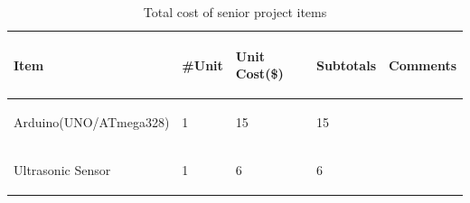 \documentclass[12pt,a4paper]{report}
\begin{document}
\section{\fontsize{12}{12}\selectfont{Resources and Cost Management}}

\begin{table}[H]
\begin{center}
\caption{Total cost of senior project items}
\label{tab:Table1}  
\begin{tabular}{|p{6cm}  |p{1cm}  |p{2cm}  |p{1.7cm} |p{3.5cm}|}

\hline
\begin{center}
\textbf{Item} 
\end{center}

& \begin{center}
\textbf{\#Unit }
\end{center}

& \begin{center}
\textbf{Unit Cost(\$)}
\end{center}

&\begin{center}
 \textbf{Subtotals}
\end{center}

& \begin{center}
\textbf{Comments}
\end{center}

 \\ 



\hline
\begin{center} Arduino(UNO/ATmega328)    \end{center}  &\begin{center}1 \end{center} & \begin{center} 15 \end{center}	& \begin{center} 15	\end{center}     &	 \\\hline


\begin{center} Ultrasonic Sensor  \end{center}  &\begin{center}1 \end{center} & \begin{center} 6 \end{center}	& \begin{center} 6	\end{center}     &	 \\\hline



\end{tabular}
\end{center}
\end{table}
\end{document}
